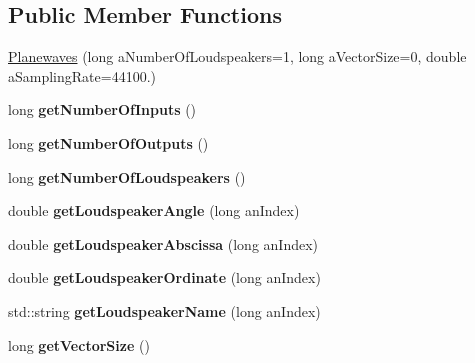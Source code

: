 \subsection*{Public Member Functions}
\begin{DoxyCompactItemize}
\item 
\hyperlink{class_planewaves_ae42541fd2c6919293813f378ccb6e785}{Planewaves} (long a\-Number\-Of\-Loudspeakers=1, long a\-Vector\-Size=0, double a\-Sampling\-Rate=44100.)
\item 
\hypertarget{class_planewaves_a3f3820b35933ce1ab38b330bb2746095}{long {\bfseries get\-Number\-Of\-Inputs} ()}\label{class_planewaves_a3f3820b35933ce1ab38b330bb2746095}

\item 
\hypertarget{class_planewaves_ad939ca3ae96ae047ad256c558c3a3bd3}{long {\bfseries get\-Number\-Of\-Outputs} ()}\label{class_planewaves_ad939ca3ae96ae047ad256c558c3a3bd3}

\item 
\hypertarget{class_planewaves_a3c086f9619574cb8978d9e646b53e9f1}{long {\bfseries get\-Number\-Of\-Loudspeakers} ()}\label{class_planewaves_a3c086f9619574cb8978d9e646b53e9f1}

\item 
\hypertarget{class_planewaves_a2e66e9164ed7367f3124b9861670154f}{double {\bfseries get\-Loudspeaker\-Angle} (long an\-Index)}\label{class_planewaves_a2e66e9164ed7367f3124b9861670154f}

\item 
\hypertarget{class_planewaves_a95945712ac223fb2a8063ba0f2f4bd2f}{double {\bfseries get\-Loudspeaker\-Abscissa} (long an\-Index)}\label{class_planewaves_a95945712ac223fb2a8063ba0f2f4bd2f}

\item 
\hypertarget{class_planewaves_aba832591da65aa8079659b13139bcf26}{double {\bfseries get\-Loudspeaker\-Ordinate} (long an\-Index)}\label{class_planewaves_aba832591da65aa8079659b13139bcf26}

\item 
\hypertarget{class_planewaves_a8a2801c80087f97ce16e883c8e9a665d}{std\-::string {\bfseries get\-Loudspeaker\-Name} (long an\-Index)}\label{class_planewaves_a8a2801c80087f97ce16e883c8e9a665d}

\item 
\hypertarget{class_planewaves_a054f1f5e7c92ecbf2216f67285a1637f}{long {\bfseries get\-Vector\-Size} ()}\label{class_planewaves_a054f1f5e7c92ecbf2216f67285a1637f}


\end{DoxyCompactItemize}
